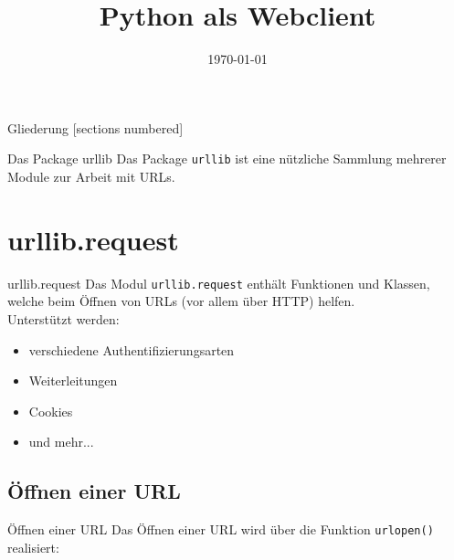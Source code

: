 



\title{Python als Webclient}
\date{\today}




\maketitle

\begin{frame}{Gliederung}
	[sections numbered]
	\tableofcontents
\end{frame}


\begin{frame}[fragile]{Das Package urllib}
	Das Package \texttt{urllib} ist eine nützliche Sammlung mehrerer Module
	zur Arbeit mit URLs.
\end{frame}


\section{urllib.request}
\begin{frame}[fragile]{urllib.request}
	Das Modul \alert{\texttt{urllib.request}} enthält Funktionen und Klassen, welche
	beim Öffnen von URLs (vor allem über HTTP) helfen. \\[.5cm]
	Unterstützt werden:
	\begin{itemize}
		\item verschiedene Authentifizierungsarten
		\item Weiterleitungen
		\item Cookies
		\item und mehr...
	\end{itemize}
\end{frame}

\subsection{Öffnen einer URL}
\begin{frame}[fragile]{Öffnen einer URL}
	Das Öffnen einer URL wird über die Funktion \alert{\texttt{urlopen()}} realisiert:
	
\end{frame}

